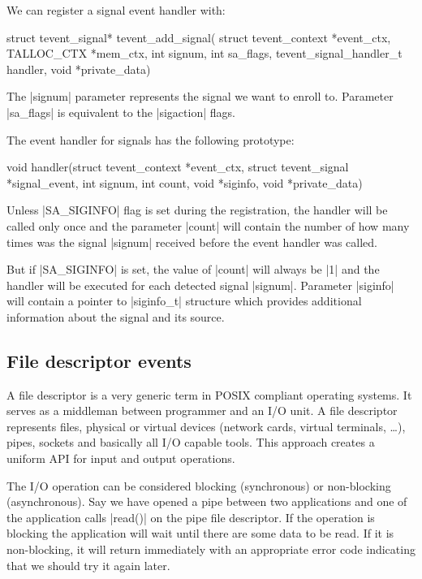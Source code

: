 \noindent
We can register a signal event handler with:

\begin{funcproto}
struct tevent_signal* tevent_add_signal(
             struct tevent_context *event_ctx,
             TALLOC_CTX *mem_ctx,
             int signum, int sa_flags,
             tevent_signal_handler_t handler,
             void *private_data)   
\end{funcproto}
\begin{funcdesc}
The |signum| parameter represents the signal we want to enroll to.
Parameter |sa_flags| is equivalent to the |sigaction| flags.
\end{funcdesc}
\funclistend
The event handler for signals has the following prototype:

\begin{funcproto}
void handler(struct tevent_context *event_ctx,
             struct tevent_signal *signal_event,
             int signum, int count, void *siginfo,
             void *private_data)
\end{funcproto}
\funclistend
Unless |SA_SIGINFO| flag is set during the registration, the handler will be
called only once and the parameter |count| will contain the number of how many
times was the signal |signum| received before the event handler was called.

But if |SA_SIGINFO| is set, the value of |count| will always be |1| and the
handler will be executed for each detected signal |signum|. Parameter |siginfo|
will contain a pointer to |siginfo_t| structure which provides additional
information about the signal and its source.

\subsection{File descriptor events}

A file descriptor is a very generic term in POSIX compliant operating
systems. It serves as a middleman between programmer and an I/O unit. A file
descriptor represents files, physical or virtual devices (network cards, virtual
terminals, \ldots), pipes, sockets and basically all I/O capable tools. This
approach creates a uniform API for input and output operations.

The I/O operation can be considered blocking (synchronous) or non-blocking
(asynchronous). Say we have opened a pipe between two applications and one of
the application calls |read()| on the pipe file descriptor. If the operation is
blocking the application will wait until there are some data to be read. If it
is non-blocking, it will return immediately with an appropriate error code
indicating that we should try it again later.

